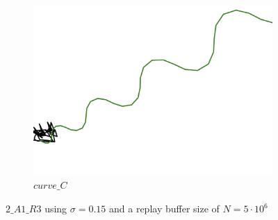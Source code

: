 \begin{figure}[H]
\begin{subfigure}[b]{0.31\textwidth}
         \includegraphics[width=\textwidth]{images/ddpg_results/simple_envs_S1_S2/S2_A1_R3_5mio_curve_C.png}
         \caption{$curve\_C$}
     \end{subfigure}
        \caption{$2\_A1\_R3$ using $\sigma=0.15$ and a replay buffer size of $N=5\cdot 10^6$}
        \label{fig:simpleCurves4}
\end{figure}

